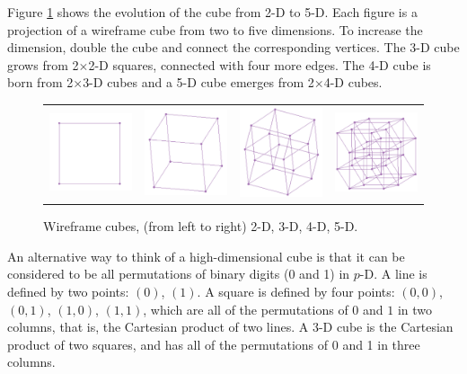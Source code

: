 Figure \ref{boxes} shows the evolution of the cube from 2-D to
5-D. Each figure is a projection of a wireframe cube from two to five
dimensions. To increase the dimension, double the cube and connect the
corresponding vertices. The 3-D cube grows from 2$\times$2-D squares,
connected with four more edges. The 4-D cube is born from 2$\times$3-D
cubes and a 5-D cube emerges from 2$\times$4-D cubes.

\begin{figure}[ht]
\centering
\begin{tabular}{cccc}
\includegraphics[width=1in]{fig/cube2D.pdf} & \includegraphics[width=1in]{fig/cube3D.pdf} &
\includegraphics[width=1in]{fig/cube4D.pdf} & \includegraphics[width=1in]{fig/cube5D.pdf}
\end{tabular}
\caption{Wireframe cubes, (from left to right) 2-D, 3-D, 4-D, 5-D.}
\label{boxes}
\end{figure}

An alternative way to think of a high-dimensional cube is that it can
be considered to be all permutations of binary digits (0 and 1) in
$p$-D. A line is defined by two points: $(0)$, $(1)$. A square is
defined by four points: $(0,0)$, $(0,1)$, $(1,0)$, $(1,1)$, which are
all of the permutations of $0$ and $1$ in two columns, that is, the
Cartesian product of two lines. A 3-D cube is the Cartesian product of
two squares, and has all of the permutations of 0 and 1 in three
columns.

